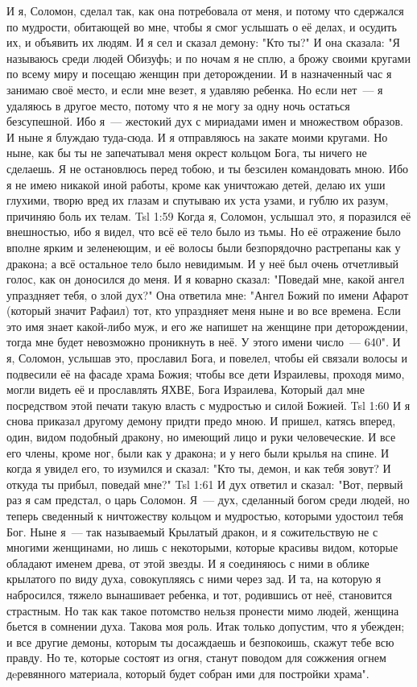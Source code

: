 И я, Соломон, сделал так, как она потребовала от меня, и потому что сдержался по мудрости, обитающей во мне, чтобы я смог услышать о её делах, и осудить их, и объявить их людям. И я сел и сказал демону: "Кто ты?" И она сказала: "Я называюсь среди людей Обизуфь; и по ночам я не сплю, а брожу своими кругами по всему миру и посещаю женщин при деторождении. И в назначенный час я занимаю своё место, и если мне везет, я удавляю ребенка. Но если нет~--- я удаляюсь в другое место, потому что я не могу за одну ночь остаться безсупешной. Ибо я~--- жестокий дух с мириадами имен и множеством образов. И ныне я блуждаю туда-сюда. И я отправляюсь на закате моими кругами. Но ныне, как бы ты не запечатывал меня окрест кольцом Бога, ты ничего не сделаешь. Я не остановлюсь перед тобою, и ты безсилен командовать мною. Ибо я не имею никакой иной работы, кроме как уничтожаю детей, делаю их уши глухими, творю вред их глазам и спутываю их уста узами, и гублю их разум, причиняю боль их телам.
\vs Tsl 1:59 
Когда я, Соломон, услышал это, я поразился её внешностью, ибо я видел, что всё её тело было из тьмы. Но её отражение было вполне ярким и зеленеющим, и её волосы были безпорядочно растрепаны как у дракона; а всё остальное тело было невидимым. И у неё был очень отчетливый голос, как он доносился до меня. И я коварно сказал: "Поведай мне, какой ангел упраздняет тебя, о злой дух?" Она ответила мне: "Ангел Божий по имени Афарот (который значит Рафаил) тот, кто упраздняет меня ныне и во все времена. Если это имя знает какой-либо муж, и его же напишет на женщине при деторождении, тогда мне будет невозможно проникнуть в неё. У этого имени число~--- 640". И я, Соломон, услышав это, прославил Бога, и повелел, чтобы ей связали волосы и подвесили её на фасаде храма Божия; чтобы все дети Израилевы, проходя мимо, могли видеть её и прославлять ЯХВЕ, Бога Израилева, Который дал мне посредством этой печати такую власть с мудростью и силой Божией.
\vs Tsl 1:60 
И я снова приказал другому демону придти предо мною. И пришел, катясь вперед, один, видом подобный дракону, но имеющий лицо и руки человеческие. И все его члены, кроме ног, были как у дракона; и у него были крылья на спине. И когда я увидел его, то изумился и сказал: "Кто ты, демон, и как тебя зовут? И откуда ты прибыл, поведай мне?"
\vs Tsl 1:61 
И дух ответил и сказал: "Вот, первый раз я сам предстал, о царь Соломон. Я~--- дух, сделанный богом среди людей, но теперь сведенный к ничтожеству кольцом и мудростью, которыми удостоил тебя Бог. Ныне я~--- так называемый Крылатый дракон, и я сожительствую не с многими женщинами, но лишь с некоторыми, которые красивы видом, которые обладают именем древа, от этой звезды. И я соединяюсь с ними в облике крылатого по виду духа, совокупляясь с ними через зад. И та, на которую я набросился, тяжело вынашивает ребенка, и тот, родившись от неё, становится страстным. Но так как такое потомство нельзя пронести мимо людей, женщина бьется в сомнении духа. Такова моя роль. Итак только допустим, что я убежден; и все другие демоны, которым ты досаждаешь и безпокоишь, скажут тебе всю правду. Но те, которые состоят из огня, станут поводом для сожжения огнем дeревянного материала, который будет собран ими для постройки храма".
